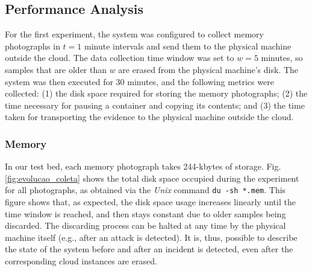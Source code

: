 \documentclass[conference]{IEEEtran}
\newcommand{\marcos}[1]{{\color{green}{MARCOS: #1}}}
\newcommand{\fancyname}{Dizang}
\begin{document}
\subsection{Performance Analysis}
\label{sec:proposal-exp}

%
For the first experiment, the system was configured to collect memory photographs in $t=1$ minute intervals and send them to the physical machine outside the cloud.
%
The data collection time window was set to $w=5$ minutes, so samples that are older than $w$ are erased from the physical machine's disk.
%
The system was then executed for 30 minutes, and the following metrics were collected: 
(1) the disk space required for storing the memory photographs; 
(2) the time necessary for pausing a container and copying its contents; and 
(3) the time taken for transporting the evidence to the physical machine outside the cloud.
%
%

\subsubsection{Memory}

In our test bed, each memory photograph takes 244-kbytes of storage.
%
Fig. \ref{fig:evolucao_coleta} shows the total disk space occupied during the experiment for all photographs, as obtained via the \textit{Unix} command \texttt{du -sh *.mem}. 
%
This figure shows that, as expected, the disk space usage increases linearly until the time window is reached, and then stays constant due to older samples being discarded.
%
The discarding process can be halted at any time by the physical machine itself (e.g., after an attack is detected).
%
It is, thus, possible to describe the state of the system before and after an incident is detected, even after the corresponding cloud instances are erased.


%
%
\end{document}
